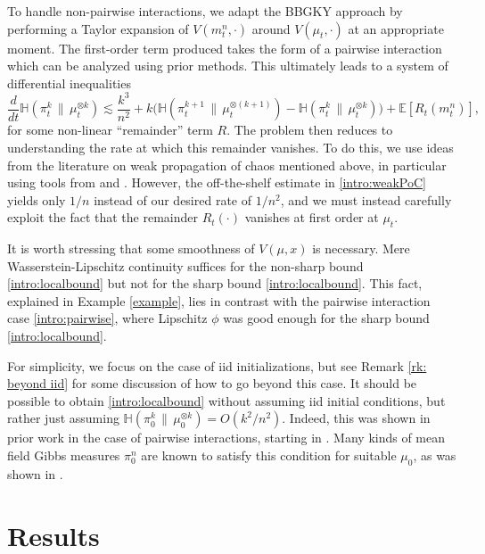 \documentclass[11pt,reqno]{amsart}
\numberwithin{equation}{section}
\theoremstyle{definition}
\def\E{{\mathbb E}}
\newcommand{\ent}{ \mathbb H}
\begin{document}
To handle non-pairwise interactions, we adapt the BBGKY approach by performing a Taylor expansion of $ V(m^n_t,\cdot)$ around $ V(\mu_t,\cdot)$ at an appropriate moment. The first-order term produced takes the form of a pairwise interaction which can be analyzed using prior methods. This ultimately leads to a system of differential inequalities
\begin{equation}
\label{eq: differential inequality}
    \frac{d}{dt}\ent(\pi^k_t\,\|\,\mu^{\otimes k}_t)\lesssim \frac{k^3}{n^2}+k\Big(\ent(\pi^{k+1}_t\,\|\,\mu^{\otimes (k+1)}_t)-\ent(\pi^k_t\,\|\,\mu^{\otimes k}_t)\Big)+\E [R_t(m^n_t)],
\end{equation}
for some non-linear ``remainder'' term $R$. The problem then reduces to understanding the rate at which this  remainder vanishes. To do this, we use ideas from the literature on weak propagation of chaos mentioned above, in particular using tools from \cite{Chassagneux2022-jt} and \cite{Buckdahn2017-op}. However, the off-the-shelf estimate in \eqref{intro:weakPoC} yields only $1/n$ instead of our desired rate of $1/n^2$, and we must instead carefully exploit the fact that the remainder $R_t(\cdot)$ vanishes at first order at $\mu_t$. 


It is worth stressing that some smoothness of $ V(\mu,x)$ is necessary. Mere Wasserstein-Lipschitz continuity suffices for the non-sharp bound \eqref{intro:localbound} but  not  for the sharp bound \eqref{intro:localbound}. This fact, explained in Example \ref{example}, lies in contrast with the pairwise interaction case \eqref{intro:pairwise}, where Lipschitz $\phi$ was good enough for the sharp bound \eqref{intro:localbound}.

For simplicity, we focus on the case of iid initializations, but see Remark \ref{rk: beyond iid} for some discussion of how to go beyond this case. 
It should be possible to obtain \eqref{intro:localbound} without assuming iid initial conditions, but rather just assuming  $\ent(\pi^k_0\,\|\,\mu^{\otimes k}_0)=O(k^2/n^2)$.
Indeed, this was shown in prior work in the case of pairwise interactions, starting in \cite{SharpChaosLacker2023}. Many kinds of mean field Gibbs measures $\pi^n_0$ are known to satisfy this condition for suitable $\mu_0$, as was shown in \cite{lacker2022quantitative,ren2024sizechaosgibbsmeasures}.


\section{Results} \label{se:mainresults}
\end{document}
